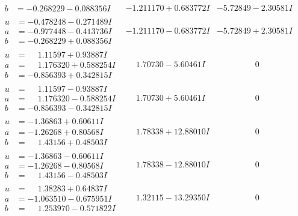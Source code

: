 \documentclass[1p]{elsarticle_modified}
\theoremstyle{definition}
\begin{document}
$$\begin{array}{c|c|c}
\begin{aligned}
b &= -0.268229 - 0.088356 I\end{aligned}
 & -1.211170 + 0.683772 I & -5.72849 - 2.30581 I \\ \hline\begin{aligned}
u &= -0.478248 - 0.271489 I \\
a &= -0.977448 - 0.413736 I \\
b &= -0.268229 + 0.088356 I\end{aligned}
 & -1.211170 - 0.683772 I & -5.72849 + 2.30581 I \\ \hline\begin{aligned}
u &= \phantom{-}1.11597 + 0.93887 I \\
a &= \phantom{-}1.176320 + 0.588254 I \\
b &= -0.856393 + 0.342815 I\end{aligned}
 & \phantom{-}1.70730 - 5.60461 I & \phantom{-0.000000 } 0 \\ \hline\begin{aligned}
u &= \phantom{-}1.11597 - 0.93887 I \\
a &= \phantom{-}1.176320 - 0.588254 I \\
b &= -0.856393 - 0.342815 I\end{aligned}
 & \phantom{-}1.70730 + 5.60461 I & \phantom{-0.000000 } 0 \\ \hline\begin{aligned}
u &= -1.36863 + 0.60611 I \\
a &= -1.26268 + 0.80568 I \\
b &= \phantom{-}1.43156 + 0.48503 I\end{aligned}
 & \phantom{-}1.78338 + 12.88010 I & \phantom{-0.000000 } 0 \\ \hline\begin{aligned}
u &= -1.36863 - 0.60611 I \\
a &= -1.26268 - 0.80568 I \\
b &= \phantom{-}1.43156 - 0.48503 I\end{aligned}
 & \phantom{-}1.78338 - 12.88010 I & \phantom{-0.000000 } 0 \\ \hline\begin{aligned}
u &= \phantom{-}1.38283 + 0.64837 I \\
a &= -1.063510 - 0.675951 I \\
b &= \phantom{-}1.253970 - 0.571822 I\end{aligned}
 & \phantom{-}1.32115 - 13.29350 I & \phantom{-0.000000 } 0 \\ \hline\begin{aligned}

\end{aligned}
\end{array}$$
\end{document}
